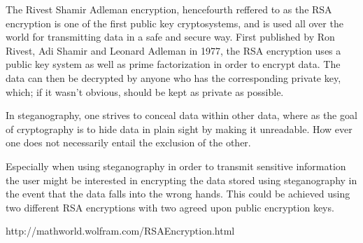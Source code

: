 The Rivest Shamir Adleman encryption, hencefourth reffered to as the RSA encryption is one of the first public key cryptosystems, and is used all over the world for transmitting data in a safe and secure way.
First published by Ron Rivest, Adi Shamir and Leonard Adleman in 1977, the RSA encryption uses a public key system as well as prime factorization in order to encrypt data.
The data can then be decrypted by anyone who has the corresponding private key, which; if it wasn't obvious, should be kept as private as possible.

In steganography, one strives to conceal data within other data, where as the goal of cryptography is to hide data in plain sight by making it unreadable.
How ever one does not necessarily entail the exclusion of the other.

Especially when using steganography in order to transmit sensitive information the user might be interested in encrypting the data stored using steganography in the event that the data falls into the wrong hands.
This could be achieved using two different RSA encryptions with two agreed upon public encryption keys.

http://mathworld.wolfram.com/RSAEncryption.html